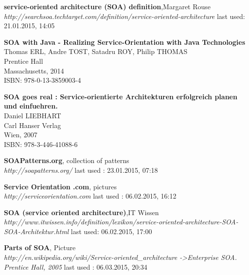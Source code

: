\documentclass[12pt]{article}
\begin{document}
\listoffigures
\printglossaries
\begin{thebibliography}{56}

   \textbf{service-oriented architecture (SOA) definition},Margaret Rouse \\
  \textit{http://searchsoa.techtarget.com/definition/service-oriented-architecture}
  \newline last used: 21.01.2015, 14:05

   \textbf{SOA with Java - Realizing Service-Orientation with Java Technologies}\\
   Thomas ERL, Andre TOST, Satadru ROY, Philip THOMAS \\ 
   Prentice Hall \\
   Massachusetts, 2014 \\
	ISBN: 978-0-13-3859003-4 

   \textbf{SOA goes real : Service-orientierte Architekturen erfolgreich planen und einfuehren.}\\
   Daniel LIEBHART \\ 
   Carl Hanser Verlag \\
   Wien, 2007 \\
	ISBN: 978-3-446-41088-6

  \textbf{SOAPatterns.org}, collection of patterns\\
  \textit{http://soapatterns.org/}
  \newline last used : 23.01.2015, 07:18

  \textbf{Service Orientation .com}, pictures\\
  \textit{http://serviceorientation.com}
  \newline last used : 06.02.2015, 16:12

   \textbf{SOA (service oriented architecture)},IT Wissen \\
  \textit{http://www.itwissen.info/definition/lexikon/service-oriented-architecture-SOA-SOA-Architektur.html}
  \newline last used: 06.02.2015, 17:00

   
   \textbf{Parts of SOA}, Picture \\
  \textit{http://en.wikipedia.org/wiki/Service-oriented\_architecture -\textgreater Enterprise SOA. Prentice Hall, 2005}
  \newline last used : 06.03.2015, 20:34 	


\end{thebibliography}
\end{document}
